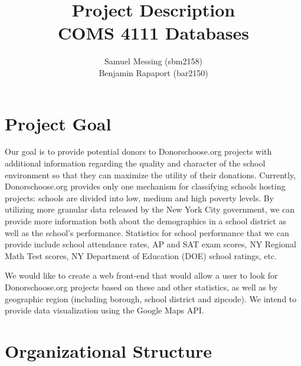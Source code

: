 \documentclass{article}
\title{Project Description \\ COMS 4111 Databases}
\author{Samuel Messing (sbm2158) \\ Benjamin Rapaport (bar2150)}
\begin{document}
\maketitle

\section{Project Goal} %
\label{sec:project_goal}

Our goal is to provide potential donors to Donorschoose.org projects with additional
information regarding the quality and character of the school environment so that
they can maximize the utility of their donations. Currently, Donorschoose.org
provides only one mechanism for classifying schools hosting projects: schools are
divided into low, medium and high poverty levels. By utilizing more granular data
released by the New York City government, we can provide more information both about
the demographics in a school district as well as the school's performance.
Statistics for school performance that we can provide include school attendance
rates, AP and SAT exam scores, NY Regional Math Test scores, NY Department of
Education (DOE) school ratings, etc.

We would like to create a web front-end that would allow a user to look for
Donorschoose.org projects based on these and other statistics, as well as by
geographic region (including borough, school district and zipcode). We intend to
provide data visualization using the Google Maps API.


\section{Organizational Structure} %
\label{sec:organizational_structure}
\end{document}
